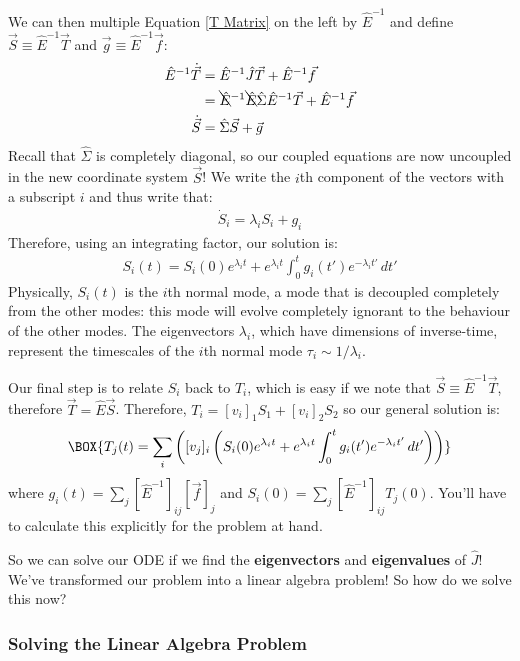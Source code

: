 We can then multiple Equation \ref{T Matrix} on the left by $\hat{E}^{-1}$ and define $\vec{S}\equiv\hat{E}^{-1}\vec{T}$ and $\vec{g}\equiv\hat{E}^{-1}\vec{f}$:
\begin{align*}
    \hat{E}^{-1}\dot{\vec{T}}
    &=
    \hat{E}^{-1}\hat{J}\vec{T}+\hat{E}^{-1}\vec{f}\\
    &=\bcancel{\hat{E}}^{-1}\bcancel{\hat{E}}\hat{\Sigma}\hat{E}^{-1}\vec{T}+\hat{E}^{-1}\vec{f}\\
    \dot{\vec{S}}&=\hat{\Sigma}\vec{S}+\vec{g}
\end{align*}
Recall that $\hat{\Sigma}$ is completely diagonal, so our coupled equations are now uncoupled in the new coordinate system $\vec{S}$! We write the $i$th component of the vectors with a subscript $i$ and thus write that:
\begin{align*}
    \dot{S}_i=\lambda_i S_i + g_i
\end{align*}
Therefore, using an integrating factor, our solution is:
\begin{align*}
    \label{Dym System Gen Sol}
    S_i(t)=S_i(0)e^{\lambda_i t}+e^{\lambda_i t}\int_{0}^{t}g_i(t')e^{-\lambda_i t'}\,dt'
\end{align*}
Physically, $S_i(t)$ is the $i$th normal mode, a mode that is decoupled completely from the other modes: this mode will evolve completely ignorant to the behaviour of the other modes. The eigenvectors $\lambda_i$, which have dimensions of inverse-time, represent the timescales of the $i$th normal mode $\tau_i\sim 1/\lambda_i$.

Our final step is to relate $S_i$ back to $T_i$, which is easy if we note that $\vec{S}\equiv\hat{E}^{-1}\vec{T}$, therefore $\vec{T}=\hat{E}\vec{S}$. Therefore, $T_i=[v_i]_1S_1+[v_i]_2S_2$ so our general solution is:
\begin{align}
    \BOX{
        T_j(t)=\sum_{i} \left( [v_j]_i \left( S_i(0)e^{\lambda_i t}+e^{\lambda_i t}\int_{0}^{t}g_i(t')e^{-\lambda_i t'}\,dt' \right) \right)
    }
\end{align}
where $g_i(t)=\sum_{j}[\hat{E}^{-1}]_{ij}[\vec{f}]_j$ and $S_i(0)=\sum_j [\hat{E}^{-1}]_{ij} T_j (0)$. You'll have to calculate this explicitly for the problem at hand.

So we can solve our ODE if we find the \textbf{eigenvectors} and \textbf{eigenvalues} of $\hat{J}$! We've transformed our problem into a linear algebra problem! So how do we solve this now?

\subsubsection{Solving the Linear Algebra Problem}\label{Lin Alg}

